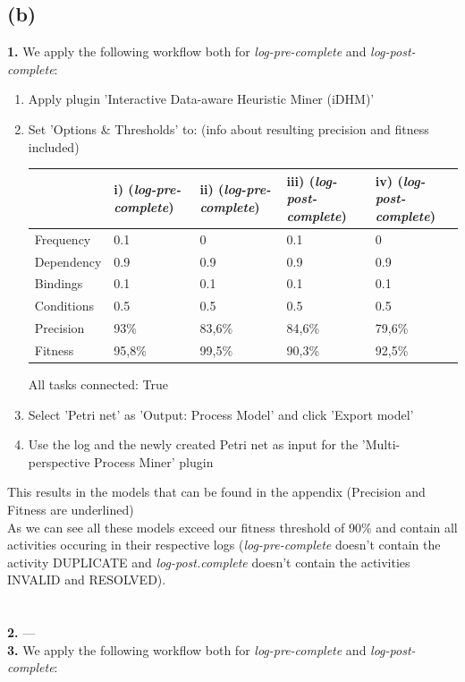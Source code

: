 \documentclass[../../main.tex]{subfiles}
\begin{document}
\subsection*{(b)}
\textbf{1.} We apply the following workflow both for \textit{log-pre-complete} and \textit{log-post-complete}:
\begin{enumerate}
\item Apply plugin 'Interactive Data-aware Heuristic Miner (iDHM)'
\item Set 'Options \& Thresholds' to: (info about resulting precision and fitness included)\\
\begin{table}[h!]
\begin{tabular}{l|llll}
           & i) (\textit{log-pre-complete}) & ii) (\textit{log-pre-complete}) & iii) (\textit{log-post-complete}) & iv) (\textit{log-post-complete})\\
           \hline
Frequency  & 0.1 & 0   & 0.1  & 0   \\
Dependency & 0.9 & 0.9 & 0.9  & 0.9 \\
Bindings   & 0.1 & 0.1 & 0.1  & 0.1 \\
Conditions & 0.5 & 0.5 & 0.5  & 0.5 \\
\hline
Precision & 93\%   & 83,6\% & 84,6\% & 79,6\% \\
Fitness   & 95,8\% & 99,5\% & 90,3\% & 92,5\% \\
\end{tabular}
\end{table}
All tasks connected: True
\item Select 'Petri net' as 'Output: Process Model' and click 'Export model'
\item Use the log and the newly created Petri net as input for the 'Multi-perspective Process Miner' plugin
\end{enumerate}
This results in the models that can be found in the appendix (Precision and Fitness are underlined)\\
As we can see all these models exceed our fitness threshold of 90\% and contain all activities occuring in their respective logs (\textit{log-pre-complete} doesn't contain the activity DUPLICATE and \textit{log-post.complete} doesn't contain the activities INVALID and RESOLVED).\\
\\ \ \\
\textbf{2.} ---\\
\textbf{3.} We apply the following workflow both for \textit{log-pre-complete} and \textit{log-post-complete}:
\end{document}
